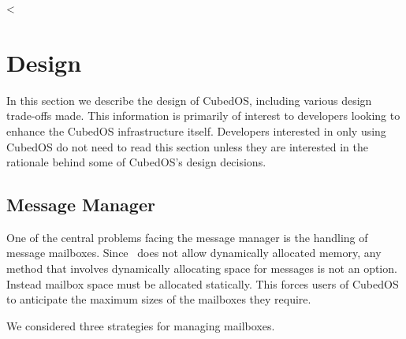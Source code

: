 <
\chapter{Design}
\label{chapt:design}

In this section we describe the design of CubedOS, including various design trade-offs made.
This information is primarily of interest to developers looking to enhance the CubedOS
infrastructure itself. Developers interested in only using CubedOS do not need to read this
section unless they are interested in the rationale behind some of CubedOS's design decisions.

\section{Message Manager}
\label{sec:design-message-manager}

One of the central problems facing the message manager is the handling of message mailboxes.
Since \SPARK\ does not allow dynamically allocated memory, any method that involves dynamically
allocating space for messages is not an option. Instead mailbox space must be allocated
statically. This forces users of CubedOS to anticipate the maximum sizes of the mailboxes they
require.

We considered three strategies for managing mailboxes.

